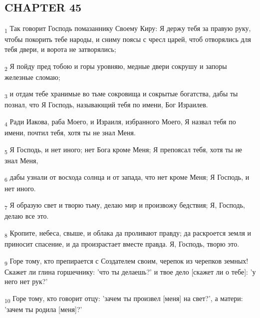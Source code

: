 \subsection{CHAPTER 45}
\begin{tcolorbox}
\textsubscript{1} Так говорит Господь помазаннику Своему Киру: Я держу тебя за правую руку, чтобы покорить тебе народы, и сниму поясы с чресл царей, чтоб отворялись для тебя двери, и ворота не затворялись;
\end{tcolorbox}
\begin{tcolorbox}
\textsubscript{2} Я пойду пред тобою и горы уровняю, медные двери сокрушу и запоры железные сломаю;
\end{tcolorbox}
\begin{tcolorbox}
\textsubscript{3} и отдам тебе хранимые во тьме сокровища и сокрытые богатства, дабы ты познал, что Я Господь, называющий тебя по имени, Бог Израилев.
\end{tcolorbox}
\begin{tcolorbox}
\textsubscript{4} Ради Иакова, раба Моего, и Израиля, избранного Моего, Я назвал тебя по имени, почтил тебя, хотя ты не знал Меня.
\end{tcolorbox}
\begin{tcolorbox}
\textsubscript{5} Я Господь, и нет иного; нет Бога кроме Меня; Я препоясал тебя, хотя ты не знал Меня,
\end{tcolorbox}
\begin{tcolorbox}
\textsubscript{6} дабы узнали от восхода солнца и от запада, что нет кроме Меня; Я Господь, и нет иного.
\end{tcolorbox}
\begin{tcolorbox}
\textsubscript{7} Я образую свет и творю тьму, делаю мир и произвожу бедствия; Я, Господь, делаю все это.
\end{tcolorbox}
\begin{tcolorbox}
\textsubscript{8} Кропите, небеса, свыше, и облака да проливают правду; да раскроется земля и приносит спасение, и да произрастает вместе правда. Я, Господь, творю это.
\end{tcolorbox}
\begin{tcolorbox}
\textsubscript{9} Горе тому, кто препирается с Создателем своим, черепок из черепков земных! Скажет ли глина горшечнику: 'что ты делаешь?' и твое дело [скажет ли о тебе]: 'у него нет рук?'
\end{tcolorbox}
\begin{tcolorbox}
\textsubscript{10} Горе тому, кто говорит отцу: 'зачем ты произвел [меня] на свет?', а матери: 'зачем ты родила [меня]?'
\end{tcolorbox}
